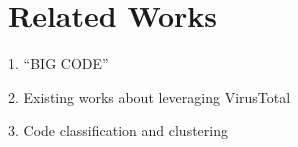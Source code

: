 \section{Related Works}
1. ``BIG CODE''

2. Existing works about leveraging VirusTotal

3. Code classification and clustering

